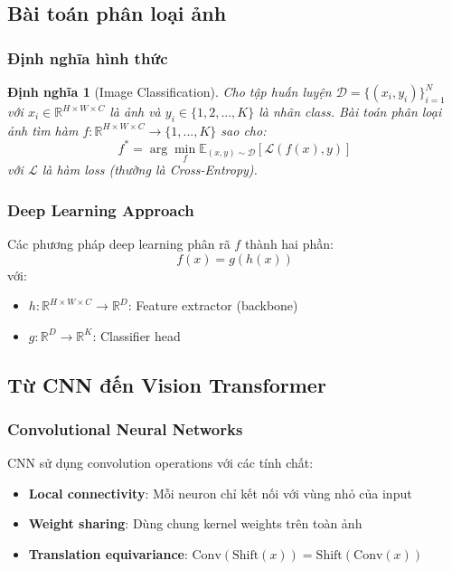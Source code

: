 \documentclass[12pt,a4paper]{article}
\newtheorem{definition}{Định nghĩa}[section]
\begin{document}
\subsection{Bài toán phân loại ảnh}

\subsubsection{Định nghĩa hình thức}

\begin{definition}[Image Classification]
Cho tập huấn luyện $\mathcal{D} = \{(x_i, y_i)\}_{i=1}^N$ với $x_i \in \mathbb{R}^{H \times W \times C}$ là ảnh và $y_i \in \{1, 2, ..., K\}$ là nhãn class. Bài toán phân loại ảnh tìm hàm $f: \mathbb{R}^{H \times W \times C} \rightarrow \{1, ..., K\}$ sao cho:
\begin{equation}
    f^* = \arg\min_f \mathbb{E}_{(x,y) \sim \mathcal{D}}[\mathcal{L}(f(x), y)]
\end{equation}
với $\mathcal{L}$ là hàm loss (thường là Cross-Entropy).
\end{definition}

\subsubsection{Deep Learning Approach}

Các phương pháp deep learning phân rã $f$ thành hai phần:
\begin{equation}
    f(x) = g(h(x))
\end{equation}
với:
\begin{itemize}
    \item $h: \mathbb{R}^{H \times W \times C} \rightarrow \mathbb{R}^D$: Feature extractor (backbone)
    \item $g: \mathbb{R}^D \rightarrow \mathbb{R}^K$: Classifier head
\end{itemize}

\subsection{Từ CNN đến Vision Transformer}

\subsubsection{Convolutional Neural Networks}

CNN sử dụng convolution operations với các tính chất:
\begin{itemize}
    \item \textbf{Local connectivity}: Mỗi neuron chỉ kết nối với vùng nhỏ của input
    \item \textbf{Weight sharing}: Dùng chung kernel weights trên toàn ảnh
    \item \textbf{Translation equivariance}: $\text{Conv}(\text{Shift}(x)) = \text{Shift}(\text{Conv}(x))$
\end{itemize}
\end{document}
